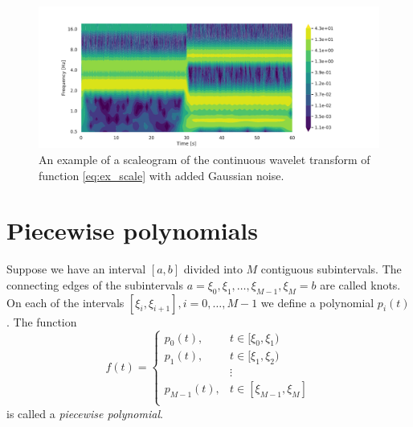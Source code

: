 \documentclass[a4paper, 10pt]{memoir}
\theoremstyle{plain}
\theoremstyle{definition}
\theoremstyle{remark}
\begin{document}
\begin{figure}[tb]
        \centering
        \includegraphics[width=\linewidth]{./code/figures/scaleogram_example.pdf}
        \caption{An example of a scaleogram of the continuous wavelet transform of function \eqref{eq:ex_scale} with added Gaussian noise.}
        \label{fig:scaleogram_ex}
\end{figure}



\section{Piecewise polynomials}
Suppose we have an interval $[a,b]$ divided into $M$ contiguous subintervals.
The connecting edges of the subintervals $a = \xi_0, \xi_1, \hdots, \xi_{M - 1}, \xi_{M} = b$ are called knots.
On each of the intervals $[\xi_i, \xi_{i+1}], i = 0, \hdots, M-1$ we define a polynomial $p_i (t)$.
The function
\begin{equation*}
        f(t) = 
                \begin{cases}
                        p_0(t), &  t \in [\xi_0, \xi_{1}) \\
                        p_1(t), & t \in [\xi_1, \xi_2)  \\
                        & \vdots \\
                        p_{M-1}(t), & t \in [\xi_{M-1}, \xi_{M}]  \\
                \end{cases}
\end{equation*}
is called a \textit{piecewise polynomial}.
\end{document}
